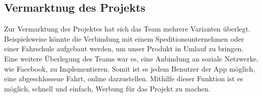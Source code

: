 \subsection{Vermarktnug des Projekts}

Zur Vermarktung des Projektes hat sich das Team mehrere Varianten überlegt.
\nextline
Beispielsweise könnte die Verbindung mit einem Speditionsunternehmen oder einer Fahrschule aufgebaut werden, um unser Produkt in Umlauf zu bringen.
\nextline
Eine weitere Überlegung des Teams war es, eine Anbindung an soziale Netzwerke, wie Facebook, zu Implementieren. Somit ist es jedem Benutzer der App möglich, eine abgeschlossene Fahrt, online darzustellen. Mithilfe dieser Funktion ist es möglich, schnell und einfach, Werbung für das Projekt zu machen.

\clearpage %